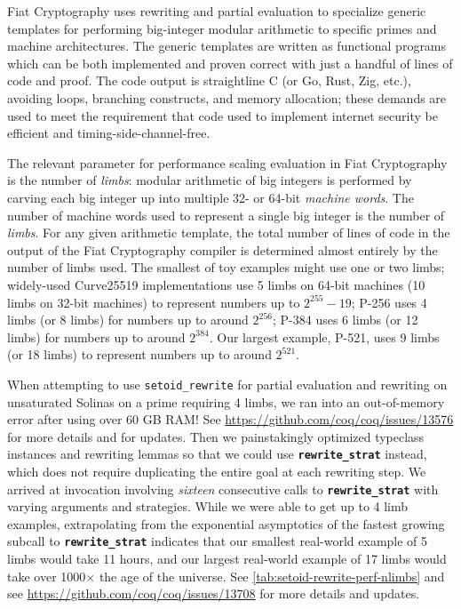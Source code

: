 \documentclass[sn-mathphys,pdflatex]{sn-jnl}%
\makeatletter
\let\@badhref=\href
\renewcommand{\href}[2]{\@badhref{#2}{#1}}
\newcommand{\coqbug}[2][Coq bug~]{\href{https://github.com/coq/coq/issues/#2}{#1\##2}}
\newcommand{\tacsetoidrewrite}{\texttt{setoid_rewrite}}
\newcommand{\tacrewritestrat}{\textbf{\texttt{rewrite\_strat}}}
\theoremstyle{thmstyleone}%
\theoremstyle{thmstyletwo}%
\theoremstyle{thmstylethree}%
\makeatother
\begin{document}
Fiat Cryptography uses rewriting and partial evaluation to specialize generic templates for performing big-integer modular arithmetic to specific primes and machine architectures.
The generic templates are written as functional programs which can be both implemented and proven correct with just a handful of lines of code and proof.
The code output is straightline C (or Go, Rust, Zig, etc.), avoiding loops, branching constructs, and memory allocation; these demands are used to meet the requirement that code used to implement internet security be efficient and timing-side-channel-free.

The relevant parameter for performance scaling evaluation in Fiat Cryptography is the number of \emph{limbs}: modular arithmetic of big integers is performed by carving each big integer up into multiple 32- or 64-bit \emph{machine words}.
The number of machine words used to represent a single big integer is the number of \emph{limbs}.
For any given arithmetic template, the total number of lines of code in the output of the Fiat Cryptography compiler %
is determined almost entirely by the number of limbs used.
The smallest of toy examples might use one or two limbs; widely-used Curve25519 implementations use 5 limbs on 64-bit machines (10 limbs on 32-bit machines) to represent numbers up to $2^{255}-19$; P-256 uses 4 limbs (or 8 limbs) for numbers up to around $2^{256}$; P-384 uses 6 limbs (or 12 limbs) for numbers up to around $2^{384}$.
Our largest example, P-521, uses 9 limbs (or 18 limbs) to represent numbers up to around $2^{521}$.

When attempting to use \tacsetoidrewrite{} for partial evaluation and rewriting on unsaturated Solinas on a prime requiring 4 limbs, we ran into an out-of-memory error after using over 60 GB RAM!
See \coqbug{13576} for more details and for updates.
Then we painstakingly optimized typeclass instances and rewriting lemmas so that we could use \tacrewritestrat{} instead, which does not require duplicating the entire goal at each rewriting step.
We arrived at invocation involving \emph{sixteen} consecutive calls to \tacrewritestrat{} with varying arguments and strategies.
While we were able to get up to 4 limb examples, extrapolating from the exponential asymptotics of the fastest growing subcall to \tacrewritestrat{} indicates that our smallest real-world example of 5 limbs would take 11 hours, and our largest real-world example of 17 limbs would take over 1000$\times$ the age of the universe.
See \autoref{tab:setoid-rewrite-perf-nlimbs} and see \coqbug{13708} for more details and updates.
\end{document}
